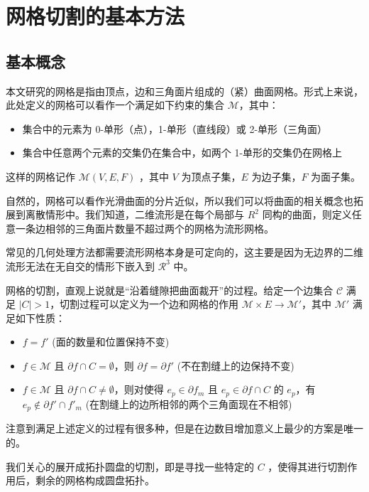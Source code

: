 
\chapter{网格切割的基本方法}

\section{基本概念}

本文研究的网格是指由顶点，边和三角面片组成的（紧）曲面网格。形式上来说，此处定义的网格可以看作一个满足如下约束的集合 $ \mathcal M $，其中：
\begin{itemize}
  \item 集合中的元素为 0-单形（点），1-单形（直线段）或 2-单形（三角面）
  \item 集合中任意两个元素的交集仍在集合中，如两个 1-单形的交集仍在网格上
\end{itemize}

这样的网格记作 $ \mathcal{M} (V, E, F) $ ，其中 $ V $ 为顶点子集，$ E $ 为边子集，$ F $ 为面子集。

自然的，网格可以看作光滑曲面的分片近似，所以我们可以将曲面的相关概念也拓展到离散情形中。我们知道，二维流形是在每个局部与 $ R^2 $ 同构的曲面，则定义任意一条边相邻的三角面片数量不超过两个的网格为流形网格。

常见的几何处理方法都需要流形网格本身是可定向的，这主要是因为无边界的二维流形无法在无自交的情形下嵌入到 $ \mathcal R^3 $ 中。

网格的切割，直观上说就是“沿着缝隙把曲面裁开”的过程。给定一个边集合 $ \mathcal C $ 满足 $ |C| > 1 $，切割过程可以定义为一个边和网格的作用 $ \mathcal{M} \times E \to \mathcal{M'} $，其中 $ \mathcal{M'} $ 满足如下性质：
\begin{itemize}
  \item $ f = f' $ (面的数量和位置保持不变)
  \item $ f \in \mathcal{M} $ 且 $ \partial f \cap C = \emptyset $，则 $ \partial f = \partial f' $ (不在割缝上的边保持不变)
  \item $ f \in \mathcal{M} $ 且 $ \partial f \cap C \ne \emptyset$，则对使得 $ e_p \in \partial f_m $ 且 $ e_p \in \partial f \cap C $ 的 $ e_p $，有 $ e_p \notin \partial f' \cap f'_m $ (在割缝上的边所相邻的两个三角面现在不相邻)
\end{itemize}

注意到满足上述定义的过程有很多种，但是在边数目增加意义上最少的方案是唯一的。

我们关心的展开成拓扑圆盘的切割，即是寻找一些特定的 $ C $ ，使得其进行切割作用后，剩余的网格构成圆盘拓扑。

